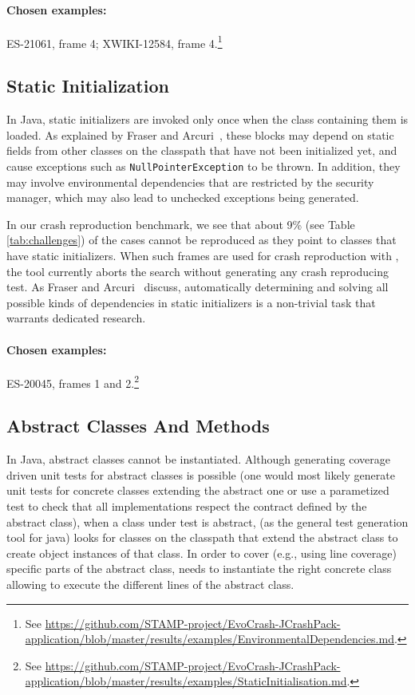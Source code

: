 \paragraph{Chosen examples:} 
ES-21061, frame 4;
XWIKI-12584, frame 4.\footnote{See \url{https://github.com/STAMP-project/EvoCrash-JCrashPack-application/blob/master/results/examples/EnvironmentalDependencies.md}.}


\subsection{Static Initialization}

In Java, static initializers are invoked only once when the class containing them is loaded.
As explained by Fraser and Arcuri~\cite{Fraser2014b}, these blocks may depend on static fields from other classes on the classpath that have not been initialized yet, and cause exceptions such as \texttt{NullPointerException} to be thrown.
In addition, they may involve environmental dependencies that are restricted by the security manager, which may also lead to unchecked exceptions being generated.

In our crash reproduction benchmark, we see that about 9\% (see Table \ref{tab:challenges}) of the cases cannot be reproduced as they point to classes that have static initializers.
When such frames are used for crash reproduction with \evocrash, the tool currently aborts the search without generating any crash reproducing test.
%
As Fraser and Arcuri~\cite{Fraser2014b} discuss, automatically determining and solving all possible kinds of dependencies in static initializers is a non-trivial task that warrants dedicated research.

\paragraph{Chosen examples:} 
ES-20045, frames 1 and 2.\footnote{See \url{https://github.com/STAMP-project/EvoCrash-JCrashPack-application/blob/master/results/examples/StaticInitialisation.md}.}


\subsection{Abstract Classes And Methods}
\label{sec:categoryabstractclasses}

In Java, abstract classes cannot be instantiated.
Although generating coverage driven unit tests for abstract classes is possible (one would most likely generate unit tests for concrete classes extending the abstract one or use a parametized test to check that all implementations respect the contract defined by the abstract class), when a class under test is abstract, \evosuite (as the general test generation tool for java) looks for classes on the classpath that extend the abstract class to create object instances of that class. 
In order to cover (e.g., using line coverage) specific parts of the abstract class, \evosuite needs to instantiate the right concrete class allowing to execute the different lines of the abstract class. 

